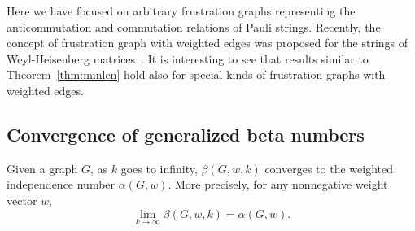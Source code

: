 Here we have focused on arbitrary frustration graphs representing the anticommutation and commutation relations of Pauli strings. Recently, the concept of frustration graph with weighted edges was proposed for the strings of Weyl-Heisenberg matrices~\cite{Makuta2025FrustrationGF}. It is interesting to see that results similar to Theorem~\ref{thm:minlen} hold also for special kinds of frustration graphs with weighted edges.

\subsection{Convergence of generalized beta numbers}
\label{ssec:gbn}
\begin{proposition}
Given a graph $G$, as $k$ goes to infinity, $\beta(G,w,k)$ converges to the weighted independence number $\alpha(G,w)$.
More precisely, for any nonnegative weight vector $w$,
\begin{equation}
	\lim_{k\to \infty} \beta(G,w,k) = \alpha(G,w).
\end{equation}    
\end{proposition}
